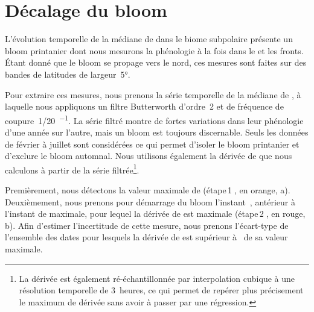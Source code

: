 \section{Décalage du bloom}
\label{sec:decalage-bloom}

L'évolution temporelle de la médiane de  dans le biome subpolaire présente un bloom printanier dont nous mesurons la phénologie  à la fois dans le  et les fronts.
Étant donné que le bloom se propage vers le nord, ces mesures sont faites sur des bandes de latitudes de largeur~\ang[mode=math]{5}.

Pour extraire ces mesures, nous prenons la série temporelle de la médiane de , à laquelle nous appliquons un filtre Butterworth d'ordre~2 et de fréquence de coupure~\qty[parse-numbers=false]{1/20}{\jours^{-1}}.
La série filtré montre de fortes variations dans leur phénologie d'une année sur l'autre, mais un bloom est toujours discernable.
Seuls les données de février à juillet sont considérées ce qui permet d'isoler le bloom printanier et d'exclure le bloom automnal.
Nous utilisons également la dérivée de  que nous calculons à partir de la série filtrée\footnote{%
  La dérivée est également ré-échantillonnée par interpolation cubique à une résolution temporelle de 3~heures, ce qui permet de repérer plus précisement le maximum de dérivée sans avoir à passer par une régression.
}.

Premièrement, nous détectons la valeur maximale de  (étape\,\textcircled{1}, en orange, a).
Deuxièmement, nous prenons pour démarrage du bloom l'instant~, antérieur à l'instant de  maximale, pour lequel la dérivée de  est maximale (étape\,\textcircled{2}, en rouge, b).
Afin d'estimer l'incertitude de cette mesure, nous prenons l'écart-type de l'ensemble des dates pour lesquels la dérivée de  est supérieur à~ de sa valeur maximale.

\begin{figure}
  \centering
  \label{fig:methode-timing-bloom}
\end{figure}

